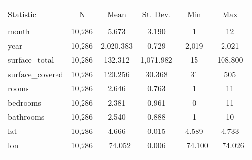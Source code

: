 
\begin{table}[!htbp] \centering 
  \caption{} 
  \label{} 
\begin{tabular}{@{\extracolsep{5pt}}lccccc} 
\\[-1.8ex]\hline 
\hline \\[-1.8ex] 
Statistic & \multicolumn{1}{c}{N} & \multicolumn{1}{c}{Mean} & \multicolumn{1}{c}{St. Dev.} & \multicolumn{1}{c}{Min} & \multicolumn{1}{c}{Max} \\ 
\hline \\[-1.8ex] 
month & 10,286 & 5.673 & 3.190 & 1 & 12 \\ 
year & 10,286 & 2,020.383 & 0.729 & 2,019 & 2,021 \\ 
surface\_total & 10,286 & 132.312 & 1,071.982 & 15 & 108,800 \\ 
surface\_covered & 10,286 & 120.256 & 30.368 & 31 & 505 \\ 
rooms & 10,286 & 2.646 & 0.763 & 1 & 11 \\ 
bedrooms & 10,286 & 2.381 & 0.961 & 0 & 11 \\ 
bathrooms & 10,286 & 2.540 & 0.888 & 1 & 10 \\ 
lat & 10,286 & 4.666 & 0.015 & 4.589 & 4.733 \\ 
lon & 10,286 & $-$74.052 & 0.006 & $-$74.100 & $-$74.026 \\ 
\hline \\[-1.8ex] 
\end{tabular} 
\end{table} 
